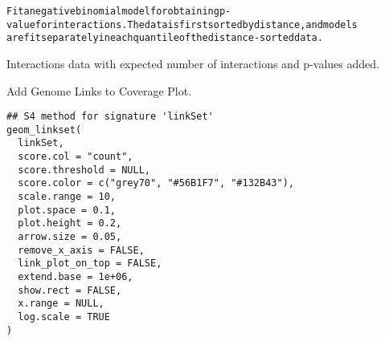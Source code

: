 \documentclass[letterpaper]{book}
\begin{document}
%
\begin{Details}
\begin{alltt}Fit a negative binomial model for obtaining p-value for interactions. The data is first sorted by distance, and models
are fit separately in each quantile of the distance-sorted data.
\end{alltt}

\end{Details}
%
\begin{Value}
Interactions data with expected number of interactions and p-values added.
\end{Value}
%
\begin{Description}
Add Genome Links to Coverage Plot.
\end{Description}
%
\begin{Usage}
\begin{verbatim}
## S4 method for signature 'linkSet'
geom_linkset(
  linkSet,
  score.col = "count",
  score.threshold = NULL,
  score.color = c("grey70", "#56B1F7", "#132B43"),
  scale.range = 10,
  plot.space = 0.1,
  plot.height = 0.2,
  arrow.size = 0.05,
  remove_x_axis = FALSE,
  link_plot_on_top = FALSE,
  extend.base = 1e+06,
  show.rect = FALSE,
  x.range = NULL,
  log.scale = TRUE
)
\end{verbatim}
\end{Usage}
%
\end{document}
